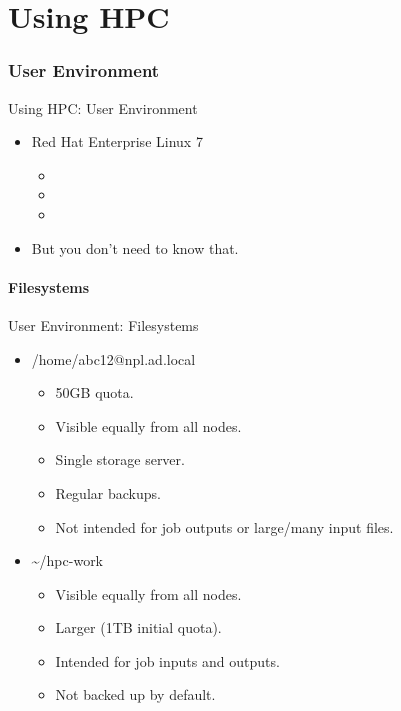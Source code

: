 \part{Using HPC}
\begin{frame}
\partpage
\end{frame}

\section{User Environment}
\begin{frame}{Using HPC: User Environment}
\begin{itemize}
\item<1,3->{\alert<1>{{Red Hat Enterprise Linux 7}}}
\begin{itemize}
\item{}
\item{}
\item{}
\end{itemize}
\item<2->{But you don't need to know that.}
\end{itemize}
\end{frame}

\subsection{Filesystems}
\begin{frame}{User Environment: Filesystems}
\begin{itemize}
\item{\alert{/home/abc12@npl.ad.local}}
\begin{itemize}
\item{50GB quota.}
\item{Visible equally from all nodes.}
\item{Single storage server.}
\item{Regular backups.}
\item{Not intended for job outputs or large/many input files.}
\end{itemize}
\item{\alert{\~{}/hpc-work}}
\begin{itemize}
\item{Visible equally from all nodes.}
\item{Larger (1TB initial quota).}
\item{Intended for job inputs and outputs.}
\item{{\color{red}Not backed up by default.}}
\end{itemize}
\end{itemize}
\end{frame}


